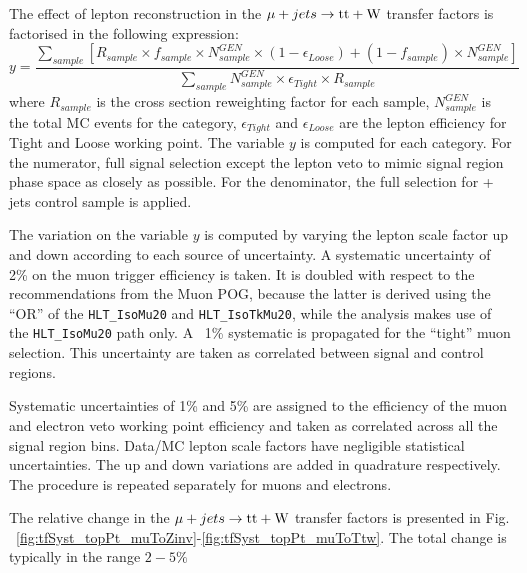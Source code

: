 The effect of lepton reconstruction in the $\mu + jets \rightarrow \mathrm{tt+W}$ 
transfer factors is factorised in the following expression: 
\begin{equation}
    \label{eq:lostLepTF}
    y = \frac{\sum_{sample} [ R_{sample} \times f_{sample} \times N^{GEN}_{sample} \times ( 1 - \epsilon_{Loose} ) + ( 1 - f_{sample} ) \times N^{GEN}_{sample} ]}{ \sum_{sample} N^{GEN}_{sample} \times \epsilon_{Tight} \times R_{sample} }
\end{equation}
where $R_{sample}$ is the cross section reweighting factor for each sample, 
$N^{GEN}_{sample}$ is the total MC events for the category, $\epsilon_{Tight}$
and $\epsilon_{Loose}$ are the lepton efficiency for Tight and Loose working 
point. The variable $y$ is computed for each category. For the numerator, full
signal selection except the lepton veto to mimic signal region phase space as
closely as possible. For the denominator, the full selection for \mj + jets 
control sample is applied.

The variation on the variable $y$ is computed by varying the lepton scale factor
up and down according to each source of uncertainty. 
A systematic uncertainty of 2\% on the muon trigger efficiency is taken. 
It is doubled with respect to the recommendations from the Muon POG, because the latter is derived using the 
``OR'' of the \verb!HLT_IsoMu20! and \verb!HLT_IsoTkMu20!, while the analysis makes use of the \verb!HLT_IsoMu20! path only. 
A ~1\% systematic is propagated for the ``tight'' muon selection. 
This uncertainty are taken as correlated between signal and control regions. 

Systematic uncertainties of 1\% and 5\% are assigned to the efficiency of the muon and electron veto working point efficiency and taken as correlated across all the signal region bins. 
Data/MC lepton scale factors have negligible statistical uncertainties. 
The up and down variations are added in quadrature respectively. 
The procedure is repeated separately for muons and
electrons. 

The relative change in the $\mu + jets \rightarrow \mathrm{tt+W}$ transfer factors 
is presented in Fig.
~\ref{fig:tfSyst_topPt_muToZinv}-\ref{fig:tfSyst_topPt_muToTtw}. The
total change is typically in the range $2-5\%$

